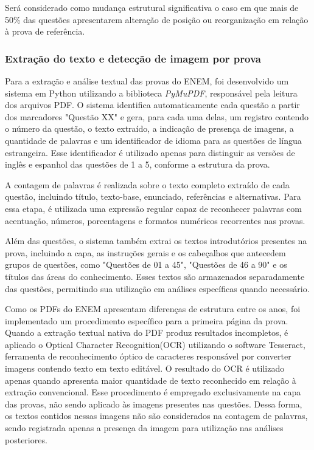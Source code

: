 \documentclass[a4paper,10pt, twocolumn]{article}
\begin{document}
Será considerado como mudança estrutural significativa o caso em que mais de 50\% das questões apresentarem alteração de posição ou reorganização em relação à prova de referência.

\subsubsection{Extração do texto e detecção de imagem por prova} 
\label{sec:qtd-palavras-imagens}

Para a extração e análise textual das provas do ENEM, foi desenvolvido um sistema em Python utilizando a biblioteca \textit{PyMuPDF}, responsável pela leitura dos arquivos PDF. O sistema identifica automaticamente cada questão a partir dos marcadores "Questão XX" e gera, para cada uma delas, um registro contendo o número da questão, o texto extraído, a indicação de presença de imagens, a quantidade de palavras e um identificador de idioma para as questões de língua estrangeira. Esse identificador é utilizado apenas para distinguir as versões de inglês e espanhol das questões de 1 a 5, conforme a estrutura da prova.

A contagem de palavras é realizada sobre o texto completo extraído de cada questão, incluindo título, texto-base, enunciado, referências e alternativas. Para essa etapa, é utilizada uma expressão regular capaz de reconhecer palavras com acentuação, números, porcentagens e formatos numéricos recorrentes nas provas.

Além das questões, o sistema também extrai os textos introdutórios presentes na prova, incluindo a capa, as instruções gerais e os cabeçalhos que antecedem grupos de questões, como "Questões de 01 a 45", "Questões de 46 a 90" e os títulos das áreas do conhecimento. Esses textos são armazenados separadamente das questões, permitindo sua utilização em análises específicas quando necessário.

Como os PDFs do ENEM apresentam diferenças de estrutura entre os anos, foi implementado um procedimento específico para a primeira página da prova. Quando a extração textual nativa do PDF produz resultados incompletos, é aplicado o Optical Character Recognition(OCR) utilizando o software Tesseract, ferramenta de reconhecimento óptico de caracteres responsável por converter imagens contendo texto em texto editável. O resultado do OCR é utilizado apenas quando apresenta maior quantidade de texto reconhecido em relação à extração convencional. Esse procedimento é empregado exclusivamente na capa das provas, não sendo aplicado às imagens presentes nas questões. Dessa forma, os textos contidos nessas imagens não são considerados na contagem de palavras, sendo registrada apenas a presença da imagem para utilização nas análises posteriores.
\end{document}
